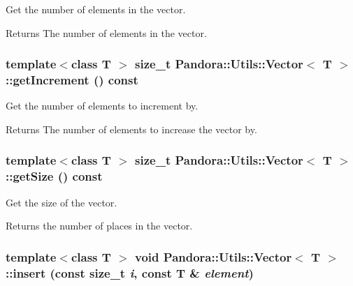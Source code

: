 Get the number of elements in the vector. \begin{DoxyReturn}{Returns}
The number of elements in the vector. 
\end{DoxyReturn}
\hypertarget{classPandora_1_1Utils_1_1Vector_aee155c4f9a304e540e359af6d3fec3d8}{
\subsubsection[{getIncrement}]{\setlength{\rightskip}{0pt plus 5cm}template$<$class T $>$ size\_\-t {\bf Pandora::Utils::Vector}$<$ T $>$::getIncrement () const}}
\label{classPandora_1_1Utils_1_1Vector_aee155c4f9a304e540e359af6d3fec3d8}


Get the number of elements to increment by. \begin{DoxyReturn}{Returns}
The number of elements to increase the vector by. 
\end{DoxyReturn}
\hypertarget{classPandora_1_1Utils_1_1Vector_a8df1cb3c4cc21dca4b093eed28c62b9a}{
\subsubsection[{getSize}]{\setlength{\rightskip}{0pt plus 5cm}template$<$class T $>$ size\_\-t {\bf Pandora::Utils::Vector}$<$ T $>$::getSize () const}}
\label{classPandora_1_1Utils_1_1Vector_a8df1cb3c4cc21dca4b093eed28c62b9a}


Get the size of the vector. \begin{DoxyReturn}{Returns}
the number of places in the vector. 
\end{DoxyReturn}
\hypertarget{classPandora_1_1Utils_1_1Vector_a8757e06ea29132d0b8873a13b6c1d956}{
\subsubsection[{insert}]{\setlength{\rightskip}{0pt plus 5cm}template$<$class T $>$ void {\bf Pandora::Utils::Vector}$<$ T $>$::insert (const size\_\-t {\em i}, \/  const T \& {\em element})}}
\label{classPandora_1_1Utils_1_1Vector_a8757e06ea29132d0b8873a13b6c1d956}


